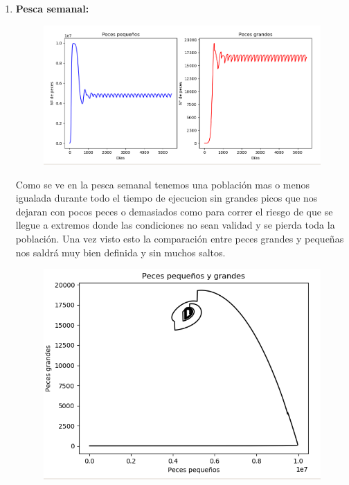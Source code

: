 \documentclass[]{article}
\begin{document}
\begin{enumerate}
	\item \textbf{Pesca semanal:}
	\begin{figure}[H]
		\centering
		\includegraphics[width=1\linewidth]{img/screenshot0026}
		\label{fig:screenshot0026}
	\end{figure}
	Como se ve en la pesca semanal tenemos una población mas o menos igualada durante todo el tiempo de ejecucion sin grandes picos que nos dejaran con pocos peces o demasiados como para correr el riesgo de que se llegue a extremos donde las condiciones no sean validad y se pierda toda la población.
	Una vez visto esto la comparación entre peces grandes y pequeñas nos saldrá muy bien definida y sin muchos saltos.
	\begin{figure}[H]
		\centering
		\includegraphics[width=0.7\linewidth]{img/screenshot0027}
		\label{fig:screenshot0027}
	\end{figure}

	


\end{enumerate}
\end{document}
